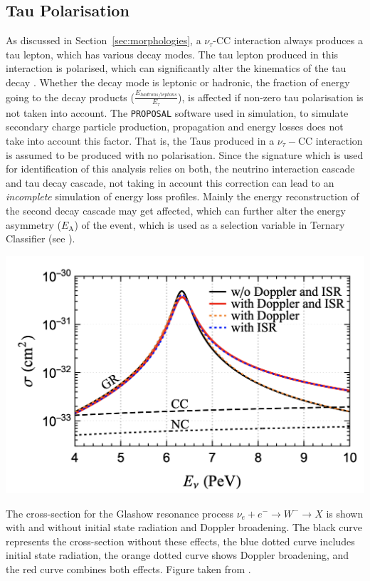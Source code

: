 \subsection{Tau Polarisation}
\label{sec:tau_polarisation}
As discussed in Section~\ref{sec:morphologies}, a $\nu_{\tau}$-CC interaction always produces a tau lepton, which has various decay modes. The tau lepton produced in this interaction is polarised, which can significantly alter the kinematics of the tau decay . Whether the decay mode is leptonic or hadronic, the fraction of energy going to the decay products ($\frac{E_{hadrons/leptons}}{E_{\tau}}$), is affected if non-zero tau polarisation is not taken into account. The \texttt{PROPOSAL} software used in simulation, to simulate secondary charge particle production, propagation and energy losses does not take into account this factor. That is, the Taus produced in a $\nu_{\tau}-$CC interaction is assumed to be produced with no polarisation. Since the signature which is used for identification of this analysis relies on both, the neutrino interaction cascade and tau decay cascade, not taking in account this correction can lead to an \emph{incomplete} simulation of energy loss profiles. Mainly the energy reconstruction of the second decay cascade may get affected, which can further alter the energy asymmetry ($E_{\mathrm{A}}$) of the event, which is used as a selection variable in Ternary Classifier (see ). 
\begin{marginfigure}
	\includegraphics{./figures/EventSample/ISR_glashow.png}
	\caption{The cross-section for the Glashow resonance process \(\nu_e +e^- \to W^- \to X\) is shown with and without initial state radiation and Doppler broadening. The black curve represents the cross-section without these effects, the blue dotted curve includes initial state radiation, the orange dotted curve shows Doppler broadening, and the red curve combines both effects. Figure taken from \cite{glashow_correcttion1}.}
\end{marginfigure}
